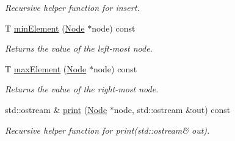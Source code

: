 \begin{DoxyCompactItemize}
\begin{DoxyCompactList}\small\item\em Recursive helper function for insert. \end{DoxyCompactList}\item 
\hypertarget{class_tree_set_a7abc9258740e39027bc4a918e706e09a}{T \hyperlink{class_tree_set_a7abc9258740e39027bc4a918e706e09a}{min\-Element} (\hyperlink{class_tree_set_1_1_node}{Node} $\ast$node) const }\label{class_tree_set_a7abc9258740e39027bc4a918e706e09a}

\begin{DoxyCompactList}\small\item\em Returns the value of the left-\/most node. \end{DoxyCompactList}\item 
\hypertarget{class_tree_set_a557335afcf7fc8bc6cc911bbcb273c6c}{T \hyperlink{class_tree_set_a557335afcf7fc8bc6cc911bbcb273c6c}{max\-Element} (\hyperlink{class_tree_set_1_1_node}{Node} $\ast$node) const }\label{class_tree_set_a557335afcf7fc8bc6cc911bbcb273c6c}

\begin{DoxyCompactList}\small\item\em Returns the value of the right-\/most node. \end{DoxyCompactList}\item 
\hypertarget{class_tree_set_ab6aecf92b718d7a0fbdff17ab53690a1}{std\-::ostream \& \hyperlink{class_tree_set_ab6aecf92b718d7a0fbdff17ab53690a1}{print} (\hyperlink{class_tree_set_1_1_node}{Node} $\ast$node, std\-::ostream \&out) const }\label{class_tree_set_ab6aecf92b718d7a0fbdff17ab53690a1}

\begin{DoxyCompactList}\small\item\em Recursive helper function for print(std\-::ostream\& out). \end{DoxyCompactList}\end{DoxyCompactItemize}
